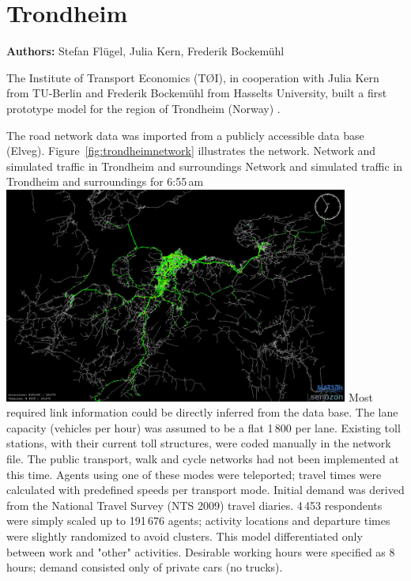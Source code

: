 \section{Trondheim}
\label{sec:trondheim}
\hfill \textbf{Authors:} Stefan Flügel, Julia Kern, Frederik Bockemühl


The Institute of Transport Economics (TØI), in cooperation with Julia Kern from TU-Berlin and Frederik Bockemühl from Hasselts University, built a first prototype model for the region of Trondheim (Norway) \citep[][]{FluegelKern_unpub_WTS_2014}.

The road network data was imported from a publicly accessible data base (Elveg). Figure~\ref{fig:trondheimnetwork} illustrates the network. 
%
\createfigure%
{Network and simulated traffic in Trondheim and surroundings}%
{Network and simulated traffic in Trondheim and surroundings for 6:55\,am \citep[source][]{FluegelEtAl_Samferdsel_2014}}%
{\label{fig:trondheimnetwork}}%
{\includegraphics[width=0.85\textwidth, angle=0]{./using/figures/trondheimnetwork.png}}%
{}
%
Most required link information could be directly inferred from the data base. The lane capacity (vehicles per hour) was assumed to be a flat 1\,800 per lane. Existing toll stations, with their current toll structures, were coded manually in the network file. The public transport, walk and cycle networks had not been implemented at this time. Agents using one of these modes were teleported; travel times were calculated with predefined speeds per transport mode. 
Initial demand was derived from the National Travel Survey (NTS 2009) travel diaries. 4\,453 respondents were simply scaled up to 191\,676 agents; activity locations and departure times were slightly randomized to avoid clusters. This model differentiated only between work and "other" activities. Desirable working hours were specified as 8\,hours; demand consisted only of private cars (no trucks). 

